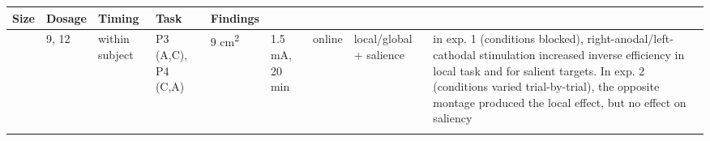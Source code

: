 \documentclass[11pt,english,]{memoir}
\begin{document}
\begin{longtable}[]{@{}lllllllll@{}}
\begin{minipage}[b]{0.04\columnwidth}
Size\strut
\end{minipage} & \begin{minipage}[b]{0.05\columnwidth}\raggedright
Dosage\strut
\end{minipage} & \begin{minipage}[b]{0.05\columnwidth}\raggedright
Timing\strut
\end{minipage} & \begin{minipage}[b]{0.08\columnwidth}\raggedright
Task\strut
\end{minipage} & \begin{minipage}[b]{0.27\columnwidth}\raggedright
Findings\strut
\end{minipage}\tabularnewline
\midrule
\endhead
\begin{minipage}[t]{0.08\columnwidth}\raggedright
\textcite{Bardi2013}\strut
\end{minipage} & \begin{minipage}[t]{0.03\columnwidth}\raggedright
9,
12\strut
\end{minipage} & \begin{minipage}[t]{0.05\columnwidth}\raggedright
within
subject\strut
\end{minipage} & \begin{minipage}[t]{0.12\columnwidth}\raggedright
P3 (A,C), P4 (C,A)\strut
\end{minipage} & \begin{minipage}[t]{0.04\columnwidth}\raggedright
9
cm\textsuperscript{2}\strut
\end{minipage} & \begin{minipage}[t]{0.05\columnwidth}\raggedright
1.5
mA, 20
min\strut
\end{minipage} & \begin{minipage}[t]{0.05\columnwidth}\raggedright
online\strut
\end{minipage} & \begin{minipage}[t]{0.08\columnwidth}\raggedright
local/global
+ salience\strut
\end{minipage} & \begin{minipage}[t]{0.27\columnwidth}\raggedright
in exp. 1 (conditions blocked),
right-anodal/left-cathodal stimulation increased
inverse efficiency in local task and for salient
targets. In exp. 2 (conditions varied
trial-by-trial), the opposite montage produced the
local effect, but no effect on saliency\strut
\end{minipage}\tabularnewline
\begin{minipage}[t]{0.08\columnwidth}\raggedright

\end{minipage}
\end{longtable}
\end{document}
